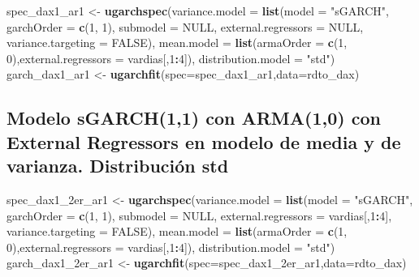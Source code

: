 \documentclass[
  11pt,
]{article}
\newenvironment{Shaded}{\begin{snugshade}}{\end{snugshade}}
\newcommand{\DataTypeTok}[1]{\textcolor[rgb]{0.13,0.29,0.53}{#1}}
\newcommand{\DecValTok}[1]{\textcolor[rgb]{0.00,0.00,0.81}{#1}}
\newcommand{\KeywordTok}[1]{\textcolor[rgb]{0.13,0.29,0.53}{\textbf{#1}}}
\newcommand{\NormalTok}[1]{#1}
\newcommand{\OperatorTok}[1]{\textcolor[rgb]{0.81,0.36,0.00}{\textbf{#1}}}
\newcommand{\OtherTok}[1]{\textcolor[rgb]{0.56,0.35,0.01}{#1}}
\newcommand{\StringTok}[1]{\textcolor[rgb]{0.31,0.60,0.02}{#1}}
\begin{document}
\begin{Shaded}
\begin{Highlighting}[]
\NormalTok{spec_dax1_ar1 <-}\StringTok{ }\KeywordTok{ugarchspec}\NormalTok{(}\DataTypeTok{variance.model =} \KeywordTok{list}\NormalTok{(}\DataTypeTok{model =} \StringTok{"sGARCH"}\NormalTok{, }\DataTypeTok{garchOrder =} \KeywordTok{c}\NormalTok{(}\DecValTok{1}\NormalTok{, }\DecValTok{1}\NormalTok{), }
                        \DataTypeTok{submodel =} \OtherTok{NULL}\NormalTok{, }\DataTypeTok{external.regressors =} \OtherTok{NULL}\NormalTok{, }\DataTypeTok{variance.targeting =} \OtherTok{FALSE}\NormalTok{), }
                        \DataTypeTok{mean.model =} \KeywordTok{list}\NormalTok{(}\DataTypeTok{armaOrder =} \KeywordTok{c}\NormalTok{(}\DecValTok{1}\NormalTok{, }\DecValTok{0}\NormalTok{),}\DataTypeTok{external.regressors =}\NormalTok{ vardias[,}\DecValTok{1}\OperatorTok{:}\DecValTok{4}\NormalTok{]),}
                        \DataTypeTok{distribution.model =} \StringTok{"std"}\NormalTok{)}
\NormalTok{garch_dax1_ar1 <-}\StringTok{ }\KeywordTok{ugarchfit}\NormalTok{(}\DataTypeTok{spec=}\NormalTok{spec_dax1_ar1,}\DataTypeTok{data=}\NormalTok{rdto_dax)}
\end{Highlighting}
\end{Shaded}

\hypertarget{modelo-sgarch11-con-arma10-con-external-regressors-en-modelo-de-media-y-de-varianza.-distribuciuxf3n-std}{%
\subsection{Modelo sGARCH(1,1) con ARMA(1,0) con External Regressors en
modelo de media y de varianza. Distribución
std}\label{modelo-sgarch11-con-arma10-con-external-regressors-en-modelo-de-media-y-de-varianza.-distribuciuxf3n-std}}

\begin{Shaded}
\begin{Highlighting}[]
\NormalTok{spec_dax1_2er_ar1 <-}\StringTok{ }\KeywordTok{ugarchspec}\NormalTok{(}\DataTypeTok{variance.model =} \KeywordTok{list}\NormalTok{(}\DataTypeTok{model =} \StringTok{"sGARCH"}\NormalTok{, }\DataTypeTok{garchOrder =} \KeywordTok{c}\NormalTok{(}\DecValTok{1}\NormalTok{, }\DecValTok{1}\NormalTok{), }
                        \DataTypeTok{submodel =} \OtherTok{NULL}\NormalTok{, }\DataTypeTok{external.regressors =}\NormalTok{ vardias[,}\DecValTok{1}\OperatorTok{:}\DecValTok{4}\NormalTok{], }\DataTypeTok{variance.targeting =} \OtherTok{FALSE}\NormalTok{), }
                        \DataTypeTok{mean.model =} \KeywordTok{list}\NormalTok{(}\DataTypeTok{armaOrder =} \KeywordTok{c}\NormalTok{(}\DecValTok{1}\NormalTok{, }\DecValTok{0}\NormalTok{),}\DataTypeTok{external.regressors =}\NormalTok{ vardias[,}\DecValTok{1}\OperatorTok{:}\DecValTok{4}\NormalTok{]),}
                        \DataTypeTok{distribution.model =} \StringTok{"std"}\NormalTok{)}
\NormalTok{garch_dax1_2er_ar1 <-}\StringTok{ }\KeywordTok{ugarchfit}\NormalTok{(}\DataTypeTok{spec=}\NormalTok{spec_dax1_2er_ar1,}\DataTypeTok{data=}\NormalTok{rdto_dax)}
\end{Highlighting}
\end{Shaded}
\end{document}
